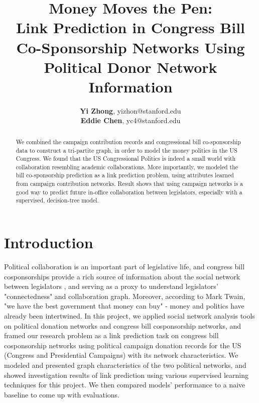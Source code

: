 \documentclass[12pt,twocolumn]{article}
\begin{document}
%
\title{Money Moves the Pen: \\ Link Prediction in Congress Bill Co-Sponsorship Networks Using Political Donor Network Information}


\author{\textbf{Yi Zhong}, yizhon@stanford.edu \\\textbf{Eddie Chen}, yc4@stanford.edu}

\maketitle

\begin{abstract}
We combined the campaign contribution records and congressional bill co-sponsorship data to construct a tri-partite graph, in order to model the money politics in the US Congress. We found that the US Congressional Politics is indeed a small world with collaboration resembling academic collaborations. More importantly, we modeled the bill co-sponsorship prediction as a link prediction problem, using attributes learned from campaign contribution networks. Result shows that using campaign networks is a good way to predict future in-office collaboration between legislators, especially with a supervised, decision-tree model. 
\end{abstract}
\section{Introduction}
Political collaboration is an important part of legislative life, and congress bill cosponsorships provide a rich source of information about the social network between legislators \cite{fowler2006connecting}, and serving as a proxy to understand legislators' "connectedness" and collaboration graph. Moreover, according to Mark Twain, "we have the best government that money can buy" - money and politics have already been intertwined. In this project, we applied social network analysis tools on political donation networks and congress bill cosponsorship networks, and framed our research problem as a link prediction task on congress bill cosponsorship networks using political campaign donation records for the US (Congress and Presidential Campaigns) with its network characteristics. We modeled and presented graph characteristics of the two political networks, and showed investigation results of link prediction using various supervised learning techniques for this project. We then compared models' performance to a naive baseline to come up with evaluations. 
\end{document}
